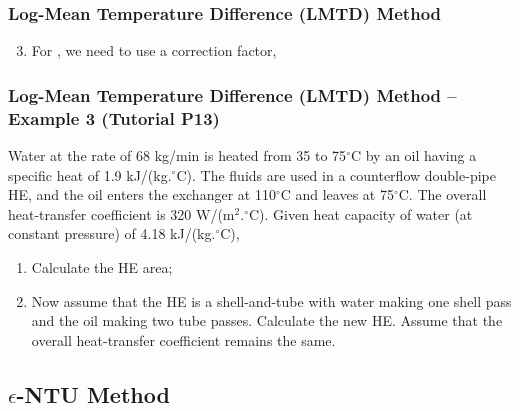 \documentclass[10pt,compress,unknownkeysallowed]{beamer}
\begin{document}
\begin{frame}
  \frametitle{Log-Mean Temperature Difference (LMTD) Method}
     \begin{enumerate}\setcounter{enumi}{2}
          \item<1-> For , we need to use a correction factor, 
     \end{enumerate}

\end{frame}

\begin{frame}
  \frametitle{Log-Mean Temperature Difference (LMTD) Method -- Example 3 (Tutorial P13)}
Water at the rate of 68 kg/min is heated from 35 to 75$^{\circ}$C by an oil having a specific heat of 1.9 kJ/(kg.$^{\circ}$C). The fluids are used in a counterflow double-pipe HE, and the oil enters the exchanger at 110$^{\circ}$C and leaves at 75$^{\circ}$C. The overall heat-transfer coefficient is 320 W/(m$^{2}.^{\circ}$C). Given heat capacity of water (at constant pressure) of 4.18 kJ/(kg.$^{\circ}$C),
\begin{enumerate}
   \item Calculate the HE area;
   \item Now assume that the HE is a shell-and-tube with water making one shell pass and the oil making two tube passes. Calculate the new HE. Assume that the overall heat-transfer coefficient remains the same. 
\end{enumerate}
\end{frame}


\subsection{$\epsilon$-NTU Method}
\end{document}
